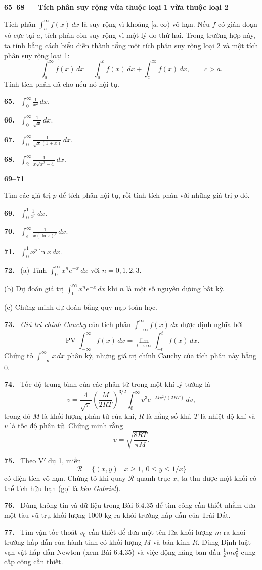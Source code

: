 \documentclass[12pt,a4paper]{article}
\newcommand{\bt}[1]{\par\smallskip\Needspace{5\baselineskip}\noindent\textbf{#1.}\ }
\newcommand{\group}[1]{\par\Needspace{11\baselineskip}\medskip\noindent\textbf{#1}\par\nopagebreak[4]}
\begin{document}
\group{65–68 — Tích phân suy rộng vừa thuộc loại 1 vừa thuộc loại 2}
Tích phân $\int_a^\infty f(x)\,dx$ là suy rộng vì khoảng $[a,\infty)$ vô hạn. Nếu $f$ có gián đoạn vô cực tại $a$, tích phân còn suy rộng vì một lý do thứ hai. Trong trường hợp này, ta tính bằng cách biểu diễn thành tổng một tích phân suy rộng loại 2 và một tích phân suy rộng loại 1:
\[\int_a^\infty f(x)\,dx=\int_a^c f(x)\,dx+\int_c^\infty f(x)\,dx,\qquad c>a.\]
Tính tích phân đã cho nếu nó hội tụ.
\bt{65} $\displaystyle \int_0^\infty\frac1{x^2}\,dx$.
\bt{66} $\displaystyle \int_0^\infty\frac1{\sqrt{x}}\,dx$.
\bt{67} $\displaystyle \int_0^\infty\frac1{\sqrt{x}(1+x)}\,dx$.
\bt{68} $\displaystyle \int_2^\infty\frac1{x\sqrt{x^2-4}}\,dx$.
\group{69–71}
Tìm các giá trị $p$ để tích phân hội tụ, rồi tính tích phân với những giá trị $p$ đó.
\bt{69} $\displaystyle\int_0^1\frac1{x^p}\,dx$.
\bt{70} $\displaystyle\int_e^\infty\frac1{x(\ln x)^p}\,dx$.
\bt{71} $\displaystyle\int_0^1x^p\ln x\,dx$.

\bt{72} (a) Tính $\int_0^\infty x^ne^{-x}\,dx$ với $n=0,1,2,3$.

(b) Dự đoán giá trị $\int_0^\infty x^ne^{-x}\,dx$ khi $n$ là một số nguyên dương bất kỳ.

(c) Chứng minh dự đoán bằng quy nạp toán học.

\bt{73} \textit{Giá trị chính Cauchy} của tích phân $\int_{-\infty}^\infty f(x)\,dx$ được định nghĩa bởi
\[\operatorname{PV}\int_{-\infty}^\infty f(x)\,dx
=\lim_{t\to\infty}\int_{-t}^t f(x)\,dx.\]
Chứng tỏ $\int_{-\infty}^\infty x\,dx$ phân kỳ, nhưng giá trị chính Cauchy của tích phân này bằng 0.

\bt{74} Tốc độ trung bình của các phân tử trong một khí lý tưởng là
\[\bar v=\frac4{\sqrt\pi}\left(\frac M{2RT}\right)^{3/2}
\int_0^\infty v^3e^{-Mv^2/(2RT)}\,dv,\]
trong đó $M$ là khối lượng phân tử của khí, $R$ là hằng số khí, $T$ là nhiệt độ khí và $v$ là tốc độ phân tử. Chứng minh rằng
\[\bar v=\sqrt{\frac{8RT}{\pi M}}.\]

\bt{75} Theo Ví dụ 1, miền
\[\mathcal R=\{(x,y)\mid x\ge1,\ 0\le y\le1/x\}\]
có diện tích vô hạn. Chứng tỏ khi quay $\mathcal R$ quanh trục $x$, ta thu được một khối có thể tích hữu hạn (gọi là \textit{kèn Gabriel}).

\bt{76} Dùng thông tin và dữ liệu trong Bài 6.4.35 để tìm công cần thiết nhằm đưa một tàu vũ trụ khối lượng 1000 kg ra khỏi trường hấp dẫn của Trái Đất.

\bt{77} Tìm vận tốc thoát $v_0$ cần thiết để đưa một tên lửa khối lượng $m$ ra khỏi trường hấp dẫn của hành tinh có khối lượng $M$ và bán kính $R$. Dùng Định luật vạn vật hấp dẫn Newton (xem Bài 6.4.35) và việc động năng ban đầu $\tfrac12mv_0^2$ cung cấp công cần thiết.
\end{document}
